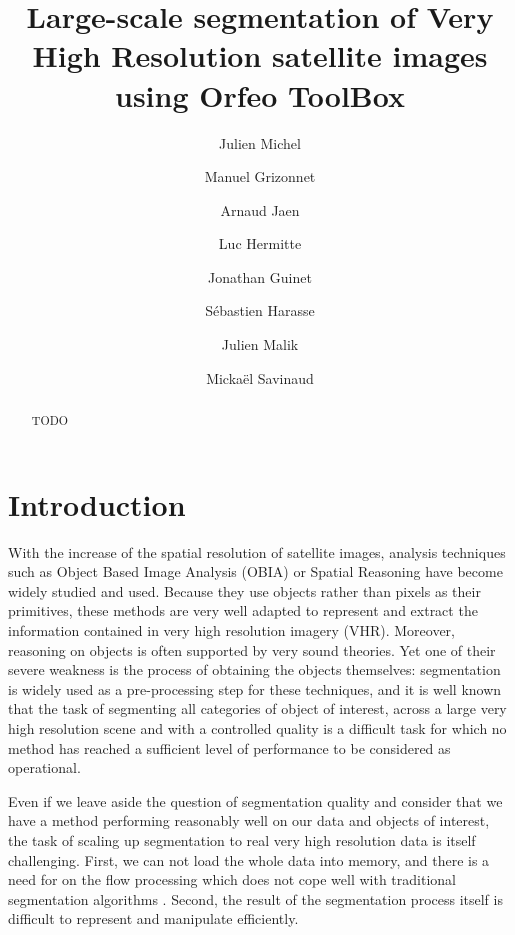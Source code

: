 \documentclass{josis}
\begin{document}
\title{Large-scale segmentation of Very High Resolution satellite images using Orfeo ToolBox}

\author{Julien Michel}
\author{Manuel Grizonnet}
\author{Arnaud Jaen}
\author{Luc Hermitte}
\author{Jonathan Guinet}
\author{S\'ebastien Harasse}
\author{Julien Malik}
\author{Micka\"el Savinaud}


\maketitle


\begin{abstract}
TODO
\end{abstract}


\section{Introduction}

With the increase of the spatial resolution of satellite images,
analysis techniques such as Object Based Image Analysis (OBIA) or Spatial
Reasoning \cite{inglada2009qualitative} have become widely studied and
used. Because they use objects rather than pixels as their primitives,
these methods are very well adapted to represent and extract the
information contained in very high resolution imagery (VHR). Moreover,
reasoning on objects is often supported by very sound theories. Yet
one of their severe weakness is the process of obtaining the objects
themselves: segmentation is widely used as a pre-processing step for
these techniques, and it is well known that the task of segmenting all
categories of object of interest, across a large very high resolution
scene and with a controlled quality is a difficult task for which no
method has reached a sufficient level of performance to be considered
as operational.

Even if we leave aside the question of segmentation quality and
consider that we have a method performing reasonably well on our data
and objects of interest, the task of scaling up segmentation to real
very high resolution data is itself challenging. First, we can not
load the whole data into memory, and there is a need for on the flow
processing which does not cope well with traditional segmentation
algorithms \cite{shi2000normalized}. Second, the result of the
segmentation process itself is difficult to represent and manipulate
efficiently.
\end{document}
